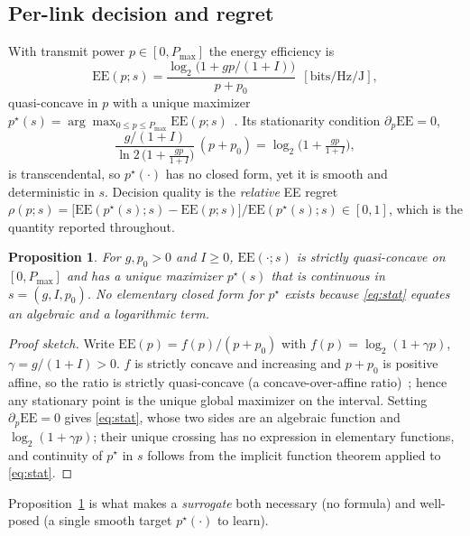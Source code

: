 \documentclass[journal]{IEEEtran}
\newtheorem{proposition}{Proposition}
\newcommand{\pstar}{p^{\star}}
\begin{document}
\subsection{Per-link decision and regret}
With transmit power $p\in[0,P_{\max}]$ the energy efficiency is
\begin{equation}
\mathrm{EE}(p;s)=\frac{\log_2\!\big(1+ g p/(1+I)\big)}{p+p_0}\ \ [\text{bits/Hz/J}],
\end{equation}
quasi-concave in $p$ with a unique maximizer
$\pstar(s)=\arg\max_{0\le p\le P_{\max}}\mathrm{EE}(p;s)$~\cite{zappone2015ee}. Its
stationarity condition $\partial_p\mathrm{EE}=0$,
\begin{equation}
\frac{g/(1+I)}{\ln 2\,\big(1+\tfrac{gp}{1+I}\big)}\,(p+p_0)=\log_2\!\Big(1+\tfrac{gp}{1+I}\Big),
\label{eq:stat}
\end{equation}
is transcendental, so $\pstar(\cdot)$ has no closed form, yet it is smooth and
deterministic in $s$. Decision quality is the \emph{relative} EE regret
$\rho(p;s)=\big[\mathrm{EE}(\pstar(s);s)-\mathrm{EE}(p;s)\big]/\mathrm{EE}(\pstar(s);s)\in[0,1]$,
which is the quantity reported throughout.

\begin{proposition}\label{prop:ee}
For $g,p_0>0$ and $I\ge 0$, $\mathrm{EE}(\cdot;s)$ is strictly quasi-concave on
$[0,P_{\max}]$ and has a unique maximizer $\pstar(s)$ that is continuous in
$s=(g,I,p_0)$. No elementary closed form for $\pstar$ exists because \eqref{eq:stat}
equates an algebraic and a logarithmic term.
\end{proposition}
\begin{proof}[Proof sketch]
Write $\mathrm{EE}(p)=f(p)/(p+p_0)$ with $f(p)=\log_2(1+\gamma p)$,
$\gamma=g/(1+I)>0$. $f$ is strictly concave and increasing and $p+p_0$ is positive
affine, so the ratio is strictly quasi-concave (a concave-over-affine
ratio)~\cite{zappone2015ee}; hence any stationary point is the unique global
maximizer on the interval. Setting $\partial_p\mathrm{EE}=0$ gives \eqref{eq:stat},
whose two sides are an algebraic function and $\log_2(1+\gamma p)$; their unique
crossing has no expression in elementary functions, and continuity of $\pstar$ in
$s$ follows from the implicit function theorem applied to \eqref{eq:stat}.
\end{proof}

Proposition~\ref{prop:ee} is what makes a \emph{surrogate} both necessary (no
formula) and well-posed (a single smooth target $\pstar(\cdot)$ to learn).
\end{document}
